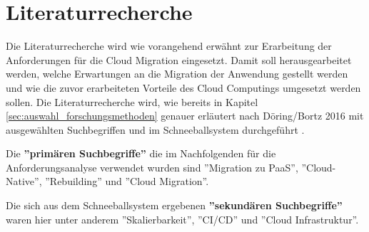 \section{Literaturrecherche}
Die Literaturrecherche wird wie vorangehend erwähnt zur Erarbeitung der Anforderungen für die Cloud Migration eingesetzt. Damit soll herausgearbeitet werden, welche Erwartungen an die Migration der Anwendung gestellt werden und wie die zuvor erarbeiteten Vorteile des Cloud Computings umgesetzt werden sollen. Die Literaturrecherche wird, wie bereits in Kapitel \ref{sec:auswahl_forschungsmethoden} genauer erläutert nach Döring/Bortz 2016 mit ausgewählten Suchbegriffen und im Schneeballsystem durchgeführt \cite[S. 158ff]{Doering2016}.

Die \textbf{''primären Suchbegriffe''} \cite[S. 158]{Doering2016} die im Nachfolgenden für die Anforderungsanalyse verwendet wurden sind ''Migration zu PaaS'', ''Cloud-Native'', ''Rebuilding'' und ''Cloud Migration''.

Die sich aus dem Schneeballsystem ergebenen \textbf{''sekundären Suchbegriffe''} \cite[S. 158]{Doering2016} waren hier unter anderem ''Skalierbarkeit'', ''CI/CD'' und ''Cloud Infrastruktur''. \pagebreak